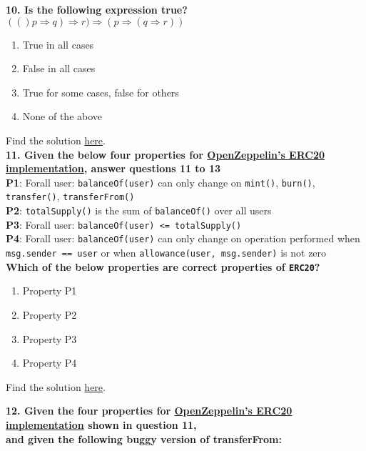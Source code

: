 \textbf{10. Is the following expression true? $(()p\Rightarrow q)\Rightarrow r)\Rightarrow(p\Rightarrow (q\Rightarrow r))$}

\begin{enumerate}[label=\Alph*.]
    \item True in all cases
    \item False in all cases
    \item True for some cases, false for others
    \item None of the above
\end{enumerate}

Find the solution \hyperref[sec:raceXcertora_q10]{here}.\\

\textbf{11. Given the below four properties for \href{https://github.com/OpenZeppelin/openzeppelin-contracts/blob/master/contracts/token/ERC20/ERC20.sol}{OpenZeppelin's ERC20 implementation}, answer questions 11 to 13}\\

\textbf{P1}: Forall user: \verb|balanceOf(user)| can only change on \verb|mint()|, \verb|burn()|, \verb|transfer()|, \verb|transferFrom()|\\
\textbf{P2}: \verb|totalSupply()| is the sum of \verb|balanceOf()| over all users\\
\textbf{P3}: Forall user: \verb|balanceOf(user) <= totalSupply()|\\
\textbf{P4}: Forall user: \verb|balanceOf(user)| can only change on operation performed when \verb|msg.sender == user| or when \verb|allowance(user, msg.sender)| is not zero\\

\textbf{Which of the below properties are correct properties of \texttt{ERC20}?}

\begin{enumerate}[label=\Alph*.]
    \item Property P1
    \item Property P2
    \item Property P3
    \item Property P4
\end{enumerate}

Find the solution \hyperref[sec:raceXcertora_q11]{here}.\\

\pagebreak

\textbf{12. Given the four properties for \href{https://github.com/OpenZeppelin/openzeppelin-contracts/blob/master/contracts/token/ERC20/ERC20.sol}{OpenZeppelin's ERC20 implementation} shown in question 11,\\ and given the following buggy version of transferFrom:}

